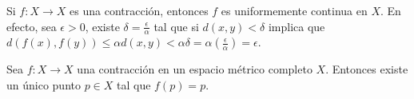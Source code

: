 \begin{remark}
Si $f: X \to X$ es una contracción, entonces $f$ es uniformemente continua en $X$. %
En efecto, sea $\epsilon > 0$, existe $\delta = \frac{\epsilon}{\alpha}$ tal que %
si $d(x, y) < \delta$ implica que $d(f(x), f(y)) \le \alpha d(x, y) < \alpha \delta = \alpha \left(\frac{\epsilon}{\alpha}\right) = \epsilon$. %
\end{remark}

\begin{teorema} %
Sea $f: X \to X$ una contracción en un espacio métrico completo $X$. %
Entonces existe un único punto $p \in X$ tal que $f(p) = p$. %
\end{teorema}

